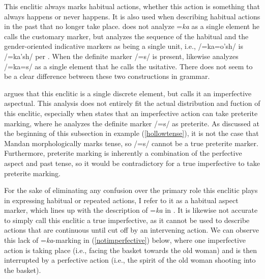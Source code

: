 This enclitic always marks habitual actions, whether this action is something that always happens or never happens. It is also used when describing habitual actions in the past that no longer take place. \citet[19]{kennard1936} does not analyze =\textit{ka} as a single element he calls the customary marker, but analyzes the sequence of the habitual and the gender-oriented indicative markers as being a single unit, i.e., /=ka=o'sh/ is /=ka'sh/ per \citeauthor{kennard1936}. When the definite marker /=s/ is present, \citeauthor{kennard1936} likewise analyzes /=ka=s/ as a single element that he calls the usitative. There does not seem to be a clear difference between these two constructions in  grammar.

\citet[444]{hollow1970} argues that this enclitic is a single discrete element, but calls it an imperfective aspectual. This analysis does not entirely fit the actual distribution and fuction of this enclitic, especially when \citeauthor{hollow1970} states that an imperfective action can take preterite marking, where he analyzes the definite marker /=s/ as preterite. As discussed at the beginning of this subsection in example (\ref{hollowtense}), it is not the case that Mandan morphologically marks tense, so /=s/ cannot be a true preterite marker. Furthermore, preterite marking is inherently a combination of the perfective aspect and past tense, so it would be contradictory for a true imperfective to take preterite marking.

For the sake of eliminating any confusion over the primary role this enclitic plays in expressing habitual or repeated actions, I refer to it as a habitual aspect marker, which lines up with the description of =\textit{ka} in \citet[27]{mixco1997a}. It is likewise not accurate to simply call this enclitic a true imperfective, as it cannot be used to describe actions that are continuous until cut off by an intervening action. We can observe this lack of =\textit{ka}-marking in (\ref{notimperfective}) below, where one imperfective action is taking place (i.e., facing the basket towards the old woman) and is then interrupted by a perfective action (i.e., the spirit of the old woman shooting into the basket).

